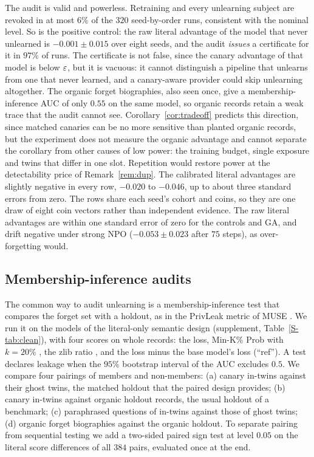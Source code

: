 The audit is valid and powerless. Retraining and every unlearning subject are revoked in at
most $6\%$ of the $320$ seed-by-order runs, consistent with the nominal level. So is the
positive control: the raw literal advantage of the model that never unlearned is
$-0.001\pm0.015$ over eight seeds, and the audit \emph{issues} a certificate for it in $97\%$
of runs. The certificate is not false, since the canary advantage of that model is below
$\varepsilon$, but it is vacuous: it cannot distinguish a pipeline that unlearns from one that never
learned, and a canary-aware provider could skip unlearning altogether. The organic forget
biographies, also seen once, give a membership-inference AUC of only $0.55$ on the same model,
so organic records retain a weak trace that the audit cannot see. Corollary~\ref{cor:tradeoff}
predicts this direction, since matched canaries can be no more sensitive than planted organic
records, but the experiment does not measure the organic advantage and cannot separate the
corollary from other causes of low power: the training budget, single exposure and twins that
differ in one slot. Repetition would restore power at the detectability price of
Remark~\ref{rem:dup}. The calibrated literal advantages are slightly negative in every row, $-0.020$
to $-0.046$, up to about three standard errors from zero. The rows share each seed's cohort
and coins, so they are one draw of eight coin vectors rather than independent evidence. The
raw literal advantages are within one standard error of zero for the controls and GA, and
drift negative under strong NPO ($-0.053\pm0.023$ after $75$ steps), as over-forgetting would.

\subsection{Membership-inference audits}\label{sec:exp-baselines}

The common way to audit unlearning is a membership-inference test that compares the forget
set with a holdout, as in the PrivLeak metric of MUSE \citep{shi2024muse}. We run it on the
models of the literal-only semantic design (supplement, Table~\ref{S-tab:clean}), with four
scores on whole records: the loss, Min-K\% Prob with $k=20\%$ \citep{shi2024mink}, the zlib
ratio \citep{carlini2021extracting}, and the loss minus the base model's loss (``ref''). A test
declares leakage when the $95\%$ bootstrap interval of the AUC excludes $0.5$. We compare four
pairings of members and non-members: (a) canary in-twins against their ghost twins, the
matched holdout that the paired design provides; (b) canary in-twins against organic holdout
records, the usual holdout of a benchmark; (c) paraphrased questions of in-twins against those
of ghost twins; (d) organic forget biographies against the organic holdout. To separate
pairing from sequential testing we add a two-sided paired sign test at level $0.05$ on the
literal score differences of all $384$ pairs, evaluated once at the end.

